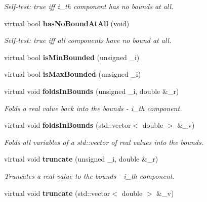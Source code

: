\begin{CompactItemize}
\begin{CompactList}\small\item\em Self-test: true iff i\_\-th component has no bounds at all. \item\end{CompactList}\item 
virtual bool {\bf has\-No\-Bound\-At\-All} (void)\label{classeo_real_base_vector_bounds_a7}

\begin{CompactList}\small\item\em Self-test: true iff all components have no bound at all. \item\end{CompactList}\item 
virtual bool {\bf is\-Min\-Bounded} (unsigned \_\-i)\label{classeo_real_base_vector_bounds_a8}

\item 
virtual bool {\bf is\-Max\-Bounded} (unsigned \_\-i)\label{classeo_real_base_vector_bounds_a9}

\item 
virtual void {\bf folds\-In\-Bounds} (unsigned \_\-i, double \&\_\-r)\label{classeo_real_base_vector_bounds_a10}

\begin{CompactList}\small\item\em Folds a real value back into the bounds - i\_\-th component. \item\end{CompactList}\item 
virtual void {\bf folds\-In\-Bounds} (std::vector$<$ double $>$ \&\_\-v)\label{classeo_real_base_vector_bounds_a11}

\begin{CompactList}\small\item\em Folds all variables of a std::vector of real values into the bounds. \item\end{CompactList}\item 
virtual void {\bf truncate} (unsigned \_\-i, double \&\_\-r)\label{classeo_real_base_vector_bounds_a12}

\begin{CompactList}\small\item\em Truncates a real value to the bounds - i\_\-th component. \item\end{CompactList}\item 
virtual void {\bf truncate} (std::vector$<$ double $>$ \&\_\-v)\label{classeo_real_base_vector_bounds_a13}


\end{CompactItemize}
